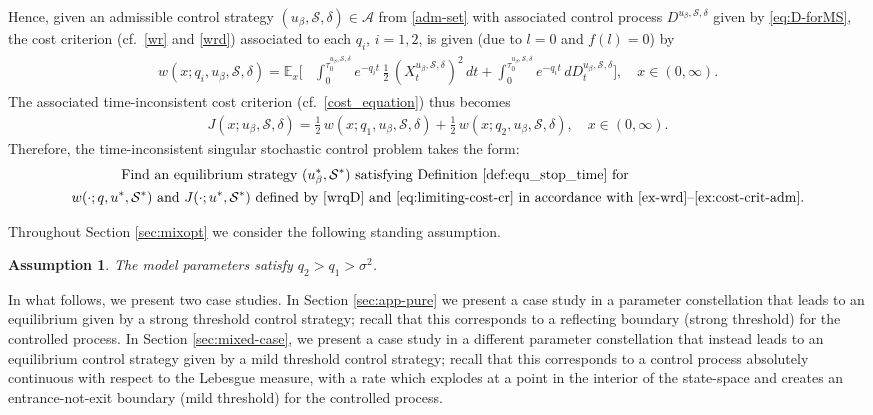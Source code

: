 \documentclass[11pt]{article} %
\newtheorem{assumption}[theorem]{Assumption}
\numberwithin{komcounter}{section}
\begin{document}
Hence, given an admissible control strategy  $(u_\beta,\mathcal{S},\delta) \in \mathcal{A}$ from \eqref{adm-set} with associated control process  $D^{u_\beta,\mathcal{S},\delta}$ given by \eqref{eq:D-forMS}, the cost criterion (cf.~\eqref{wr} and \eqref{wrd}) associated to each $q_i$, $i=1,2$, is given (due to $l=0$ and $f(l)=0$) by 
\begin{align} \label{ex-wrd} 
\begin{split}
w(x;q_i,u_\beta,\mathcal{S},\delta) = \mathbb{E}_x\bigg[ &\int_0^{\tau^{u_\beta,\mathcal{S},\delta}_0} e^{-q_i t} \, \tfrac12 \, (X^{u_\beta,\mathcal{S},\delta}_t)^2 \, dt + \int_0^{\tau^{u_\beta,\mathcal{S},\delta}_0} e^{-q_i t} \, d D^{u_\beta,\mathcal{S},\delta}_t \bigg], 
\quad x \in (0,\infty).
\end{split}
\end{align}
The associated time-inconsistent cost criterion (cf.~\eqref{cost_equation}) thus becomes 
\begin{align}\label{ex:cost-crit-adm} 
J(x;u_\beta,\mathcal{S},\delta) = \tfrac12 \, w(x; q_1,u_\beta,\mathcal{S},\delta) + \tfrac12 \, w(x; q_2,u_\beta,\mathcal{S},\delta), 
\quad x \in (0,\infty). 
\end{align}
Therefore, the time-inconsistent singular stochastic control problem takes the form: 
\begin{align} \label{TISC}
\begin{split}
&\qquad \quad \;\; \text{Find an equilibrium strategy $(u_\beta^*, \mathcal{S}^*)$ 
satisfying Definition \ref{def:equ_stop_time} for} \\ &\text{$w(\cdot;q,u^*,\mathcal{S}^*)$ and $J(\cdot; u^*,\mathcal{S}^*)$ defined by \eqref{wrqD} and \eqref{eq:limiting-cost-cr} in accordance with \eqref{ex-wrd}--\eqref{ex:cost-crit-adm}}.
\end{split}
\end{align}


 
Throughout Section \ref{sec:mixopt} we consider the following standing assumption.
\begin{assumption}\label{assum:appli}
The model parameters satisfy $q_2>q_1>\sigma^2$.
\end{assumption}



In what follows, we present two case studies. In Section \ref{sec:app-pure} we present a case study in a parameter constellation that leads to an equilibrium given by a strong threshold control strategy; recall that this corresponds to a reflecting boundary (strong threshold) for the controlled process. 
In Section \ref{sec:mixed-case}, we present a case study in a different parameter constellation that instead leads to an equilibrium control strategy given by a mild threshold control strategy; recall that this corresponds to a control process absolutely continuous with respect to the Lebesgue measure, with a rate which explodes at a point in the interior of the state-space and creates an entrance-not-exit boundary (mild threshold) for the controlled process.
\end{document}
